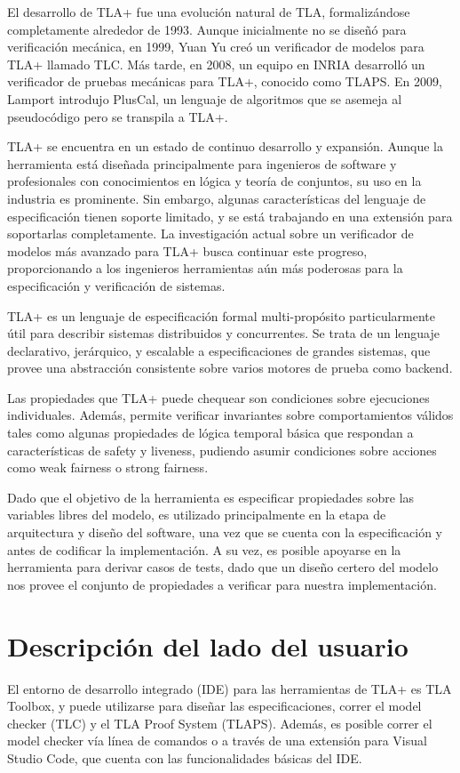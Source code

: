\documentclass[runningheads]{llncs}
\begin{document}
El desarrollo de TLA+ fue una evolución natural de TLA, formalizándose completamente alrededor de 1993. Aunque inicialmente no se diseñó para verificación mecánica, en 1999, Yuan Yu creó un verificador de modelos para TLA+ llamado TLC. Más tarde, en 2008, un equipo en INRIA desarrolló un verificador de pruebas mecánicas para TLA+, conocido como TLAPS. En 2009, Lamport introdujo PlusCal, un lenguaje de algoritmos que se asemeja al pseudocódigo pero se transpila a TLA+.

TLA+ se encuentra en un estado de continuo desarrollo y expansión. Aunque la herramienta está diseñada principalmente para ingenieros de software y profesionales con conocimientos en lógica y teoría de conjuntos, su uso en la industria es prominente. Sin embargo, algunas características del lenguaje de especificación tienen soporte limitado, y se está trabajando en una extensión para soportarlas completamente. La investigación actual sobre un verificador de modelos más avanzado para TLA+ busca continuar este progreso, proporcionando a los ingenieros herramientas aún más poderosas para la especificación y verificación de sistemas.

TLA+ es un lenguaje de especificación formal multi-propósito particularmente útil para describir sistemas distribuidos y concurrentes. Se trata de un lenguaje declarativo, jerárquico, y escalable a especificaciones de grandes sistemas, que provee una abstracción consistente sobre varios motores de prueba como backend.

Las propiedades que TLA+ puede chequear son condiciones sobre ejecuciones individuales. Además, permite verificar invariantes sobre comportamientos válidos tales como algunas propiedades de lógica temporal básica que respondan a características de safety y liveness, pudiendo asumir condiciones sobre acciones como weak fairness o strong fairness.

Dado que el objetivo de la herramienta es especificar propiedades sobre las variables libres del modelo, es utilizado principalmente en la etapa de arquitectura y diseño del software, una vez que se cuenta con la especificación y antes de codificar la implementación. A su vez, es posible apoyarse en la herramienta para derivar casos de tests, dado que un diseño certero del modelo nos provee el conjunto de propiedades a verificar para nuestra implementación.

\section{Descripción del lado del usuario}
El entorno de desarrollo integrado (IDE) para las herramientas de TLA+ es TLA Toolbox, y puede utilizarse para diseñar las especificaciones, correr el model checker (TLC) y el TLA Proof System (TLAPS). Además, es posible correr el model checker vía línea de comandos o a través de una extensión para Visual Studio Code, que cuenta con las funcionalidades básicas del IDE.
\end{document}
